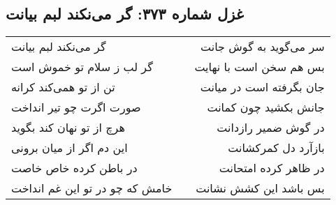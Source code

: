 \begin{center}
\section*{غزل شماره ۳۷۳: گر می‌نکند لبم بیانت}
\label{sec:0373}
\begin{longtable}{l p{0.5cm} r}
گر می‌نکند لبم بیانت
&&
سر می‌گوید به گوش جانت
\\
گر لب ز سلام تو خموش است
&&
بس هم سخن است با نهایت
\\
تن از تو همی‌کند کرانه
&&
جان بگرفته است در میانت
\\
صورت اگرت چو تیر انداخت
&&
جانش بکشید چون کمانت
\\
هرچ از تو نهان کند بگوید
&&
در گوش ضمیر رازدانت
\\
این دم اگر از میان برونی
&&
بازآرد دل کمرکشانت
\\
در باطن کرده خاص خاصت
&&
در ظاهر کرده امتحانت
\\
خامش که چو در تو این غم انداخت
&&
بس باشد این کشش نشانت
\\
\end{longtable}
\end{center}
